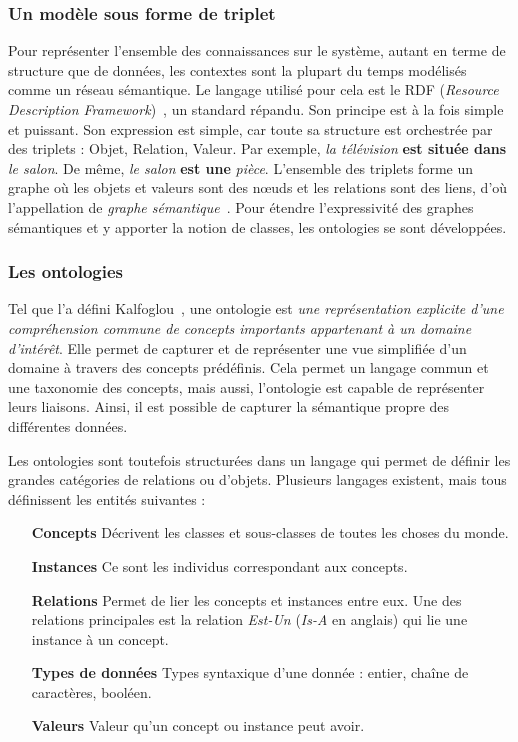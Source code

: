 \subsubsection{Un modèle sous forme de triplet}
Pour représenter l'ensemble des connaissances sur le système, autant en terme de structure que de données, les contextes sont la plupart du temps modélisés comme un réseau sémantique. Le langage utilisé pour cela est le RDF (\textit{Resource Description Framework})~\cite{W3C:RDF}, un standard répandu. Son principe est à la fois simple et puissant. Son expression est simple, car toute sa structure est orchestrée par des triplets : Objet, Relation, Valeur. Par exemple, \textit{la télévision} \textbf{est située dans} \textit{le salon}. De même, \textit{le salon} \textbf{est une} \textit{pièce}. L'ensemble des triplets forme un graphe où les objets et valeurs sont des nœuds et les relations sont des liens, d'où l'appellation de \textit{graphe sémantique}~\cite{Minsky:knowledge}. Pour étendre l'expressivité des graphes sémantiques et y apporter la notion de classes, les ontologies se sont développées.

\subsubsection{Les ontologies}
Tel que l'a défini Kalfoglou~\cite{Kalfoglou:ontology}, une ontologie est \textit{une représentation explicite d'une compréhension commune de concepts importants appartenant à un domaine d'intérêt}.
Elle permet de capturer et de représenter une vue simplifiée d'un domaine à travers des concepts prédéfinis. Cela permet un langage commun et une taxonomie des concepts, mais aussi, l'ontologie est capable de représenter leurs liaisons. Ainsi, il est possible de capturer la sémantique propre des différentes données.

Les ontologies sont toutefois structurées dans un langage qui permet de définir les grandes catégories de relations ou d'objets. Plusieurs langages existent, mais tous définissent les entités suivantes :
\begin{itemize}
    \item[\textbf{Concepts}] Décrivent les classes et sous-classes de toutes les choses du monde.
    \item[\textbf{Instances}] Ce sont les individus correspondant aux concepts.
    \item[\textbf{Relations}] Permet de lier les concepts et instances entre eux. Une des relations principales est la relation \textit{Est-Un} (\textit{Is-A} en anglais) qui lie une instance à un concept.
    \item[\textbf{Types de données}] Types syntaxique d'une donnée : entier, chaîne de caractères, booléen.
    \item[\textbf{Valeurs}] Valeur qu'un concept ou instance peut avoir.
\end{itemize}

